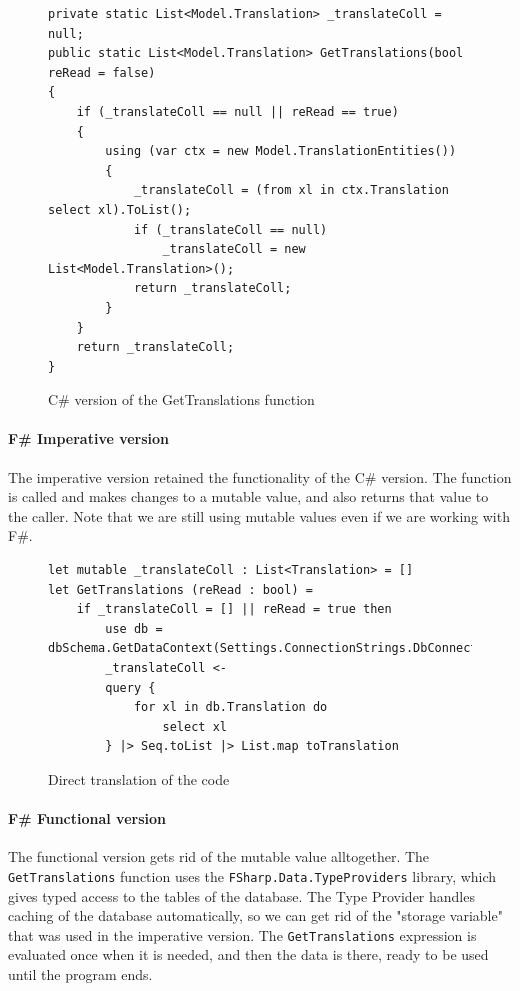 \documentclass[12pt, a4paper]{article}
\newcommand{\code}[1]{{\small \texttt{#1}}}
\begin{document}
\begin{figure}[!h]
\begin{lstlisting}
private static List<Model.Translation> _translateColl = null; 
public static List<Model.Translation> GetTranslations(bool reRead = false)
{
    if (_translateColl == null || reRead == true)
    {
        using (var ctx = new Model.TranslationEntities())
        {
            _translateColl = (from xl in ctx.Translation select xl).ToList();
            if (_translateColl == null)
                _translateColl = new List<Model.Translation>();
            return _translateColl;
        }
    }
    return _translateColl;
}
\end{lstlisting}
\caption{C\# version of the GetTranslations function}
\end{figure}

\newpage


\paragraph{F\# Imperative version} The imperative version retained the functionality of the C\# version. The function is called and makes changes to a mutable value, and also returns that value to the caller. Note that we are still using mutable values even if we are working with F\#.

\begin{figure}[!h]
\begin{lstlisting}
let mutable _translateColl : List<Translation> = []
let GetTranslations (reRead : bool) =
    if _translateColl = [] || reRead = true then
        use db = dbSchema.GetDataContext(Settings.ConnectionStrings.DbConnectionString)
        _translateColl <- 
        query {
            for xl in db.Translation do 
                select xl
        } |> Seq.toList |> List.map toTranslation
\end{lstlisting}
\caption{Direct translation of the code}
\end{figure}

\newpage


\paragraph{F\# Functional version} The functional version gets rid of the mutable value alltogether. The \code{GetTranslations} function uses the \code{FSharp.Data.TypeProviders} library, which gives typed access to the tables of the database. The Type Provider handles caching of the database automatically, so we can get rid of the "storage variable" that was used in the imperative version. The \code{GetTranslations} expression is evaluated once when it is needed, and then the data is there, ready to be used until the program ends.
\end{document}
